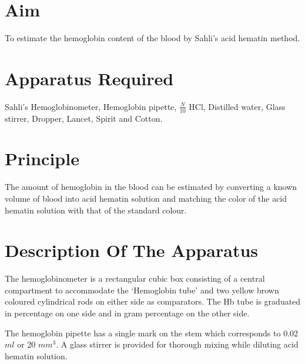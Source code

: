 \documentclass[a4paper,12pt,openany,twoside]{book}
\begin{document}
							\section*{Aim}

								To estimate the hemoglobin content of the blood by Sahli’s acid hematin method.
								\section*{Apparatus Required}
								Sahli’s Hemoglobinometer, Hemoglobin pipette, $\frac{N}{10}$ HCl, Distilled water, Glass stirrer, Dropper, Lancet, Spirit and Cotton.
								\section*{Principle}
								The amount of hemoglobin in the blood can be estimated by converting a known volume of blood into acid hematin solution and matching the color of the acid hematin solution with that of the standard colour.
								\section*{Description Of The Apparatus}
								The hemoglobinometer is a rectangular cubic box consisting of a central compartment to accommodate the ‘Hemoglobin tube’ and two yellow brown coloured cylindrical rods on either side as comparators. The Hb tube is graduated in percentage on one side and in gram percentage on the other side.

								The hemoglobin pipette has a single mark on the stem which corresponds to 0.02 $ml$ or 20 $mm^{3}$. A glass stirrer is provided for thorough mixing while diluting acid hematin solution.
\end{document}
